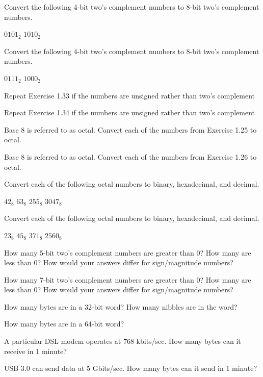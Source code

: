 \exercise %
Convert the following 4-bit two's complement numbers to 8-bit two's complement numbers.
\begin{tasks}
	\task $0101_2$
	\task $1010_2$
\end{tasks}

\exercise %
Convert the following 4-bit two's complement numbers to 8-bit two's complement numbers.
\begin{tasks}
	\task $0111_2$
	\task $1000_2$
\end{tasks}

\exercise %
Repeat Exercise 1.33 if the numbers are unsigned rather than two's complement

\exercise %
Repeat Exercise 1.34 if the numbers are unsigned rather than two's complement

\exercise %
Base 8 is referred to as octal. Convert each of the numbers from Exercise 1.25 to octal.

\exercise %
Base 8 is referred to as octal. Convert each of the numbers from Exercise 1.26 to octal.

\exercise %
Convert each of the following octal numbers to binary, hexadecimal, and decimal.
\begin{tasks}
	\task $42_8$
	\task $63_8$
	\task $255_8$
	\task $3047_8$
\end{tasks}

\exercise %
Convert each of the following octal numbers to binary, hexadecimal, and decimal.
\begin{tasks}
	\task $23_8$
	\task $45_8$
	\task $371_8$
	\task $2560_8$
\end{tasks}

\exercise %
How many 5-bit two's complement numbers are greater than 0? How many are less than 0?
How would your answers differ for sign/magnitude numbers?

\exercise %
How many 7-bit two's complement numbers are greater than 0? How many are less than 0?
How would your answers differ for sign/magnitude numbers?

\exercise %
How many bytes are in a 32-bit word? How many nibbles are in the word?

\exercise %
How many bytes are in a 64-bit word?

\exercise %
A particular DSL modem operates at 768 kbits/sec. How many bytes can it receive in 1 minute?

\exercise %
USB 3.0 can send data at 5 Gbits/sec. How many bytes can it send in 1 minute?

